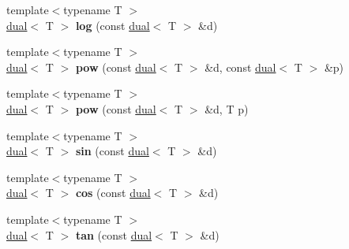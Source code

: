 \begin{DoxyCompactItemize}
\item 
\hypertarget{namespace_d_r_d_s_p_a6039dc69feffbf6e0dea9430d8e05d33}{{\footnotesize template$<$typename T $>$ }\\\hyperlink{struct_d_r_d_s_p_1_1dual}{dual}$<$ T $>$ {\bfseries log} (const \hyperlink{struct_d_r_d_s_p_1_1dual}{dual}$<$ T $>$ \&d)}\label{namespace_d_r_d_s_p_a6039dc69feffbf6e0dea9430d8e05d33}

\item 
\hypertarget{namespace_d_r_d_s_p_ac4ae849223e1446bfbeb3b0da0c0ab2c}{{\footnotesize template$<$typename T $>$ }\\\hyperlink{struct_d_r_d_s_p_1_1dual}{dual}$<$ T $>$ {\bfseries pow} (const \hyperlink{struct_d_r_d_s_p_1_1dual}{dual}$<$ T $>$ \&d, const \hyperlink{struct_d_r_d_s_p_1_1dual}{dual}$<$ T $>$ \&p)}\label{namespace_d_r_d_s_p_ac4ae849223e1446bfbeb3b0da0c0ab2c}

\item 
\hypertarget{namespace_d_r_d_s_p_a0e9da5dabdf9cab3f150f189d93f93a6}{{\footnotesize template$<$typename T $>$ }\\\hyperlink{struct_d_r_d_s_p_1_1dual}{dual}$<$ T $>$ {\bfseries pow} (const \hyperlink{struct_d_r_d_s_p_1_1dual}{dual}$<$ T $>$ \&d, T p)}\label{namespace_d_r_d_s_p_a0e9da5dabdf9cab3f150f189d93f93a6}

\item 
\hypertarget{namespace_d_r_d_s_p_a1deafac738dc73b02a6f335b637b749c}{{\footnotesize template$<$typename T $>$ }\\\hyperlink{struct_d_r_d_s_p_1_1dual}{dual}$<$ T $>$ {\bfseries sin} (const \hyperlink{struct_d_r_d_s_p_1_1dual}{dual}$<$ T $>$ \&d)}\label{namespace_d_r_d_s_p_a1deafac738dc73b02a6f335b637b749c}

\item 
\hypertarget{namespace_d_r_d_s_p_a702ab33d935b31b3f89a9d22c225b76d}{{\footnotesize template$<$typename T $>$ }\\\hyperlink{struct_d_r_d_s_p_1_1dual}{dual}$<$ T $>$ {\bfseries cos} (const \hyperlink{struct_d_r_d_s_p_1_1dual}{dual}$<$ T $>$ \&d)}\label{namespace_d_r_d_s_p_a702ab33d935b31b3f89a9d22c225b76d}

\item 
\hypertarget{namespace_d_r_d_s_p_a903badd2bf2f5c2985dce04e9c520f2d}{{\footnotesize template$<$typename T $>$ }\\\hyperlink{struct_d_r_d_s_p_1_1dual}{dual}$<$ T $>$ {\bfseries tan} (const \hyperlink{struct_d_r_d_s_p_1_1dual}{dual}$<$ T $>$ \&d)}\label{namespace_d_r_d_s_p_a903badd2bf2f5c2985dce04e9c520f2d}


\end{DoxyCompactItemize}
